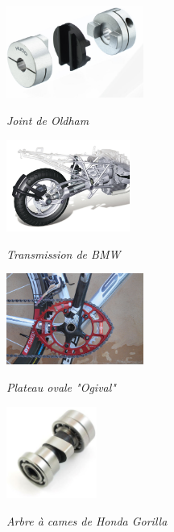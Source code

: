\documentclass[11pt,oneside]{article}
\begin{document}
\begin{minipage}[c]{.22\linewidth}
\begin{center}
\includegraphics[height=3cm]{png/img_01}

\textit{Joint de Oldham\cite{oldham}}
\end{center}
\end{minipage} \hfill
\begin{minipage}[c]{.22\linewidth}
\begin{center}
\includegraphics[height=3cm]{png/img_02}

\textit{Transmission de BMW\cite{bmw}}
\end{center}
\end{minipage} \hfill
\begin{minipage}[c]{.22\linewidth}
\begin{center}
\includegraphics[height=3cm]{png/img_03}

\textit{Plateau ovale "Ogival"\cite{ogival}}
\end{center}
\end{minipage} \hfill
\begin{minipage}[c]{.22\linewidth}
\begin{center}
\includegraphics[height=3cm]{png/img_04}

\textit{Arbre à cames de Honda Gorilla\cite{came}}
\end{center}
\end{minipage} 
\end{document}
